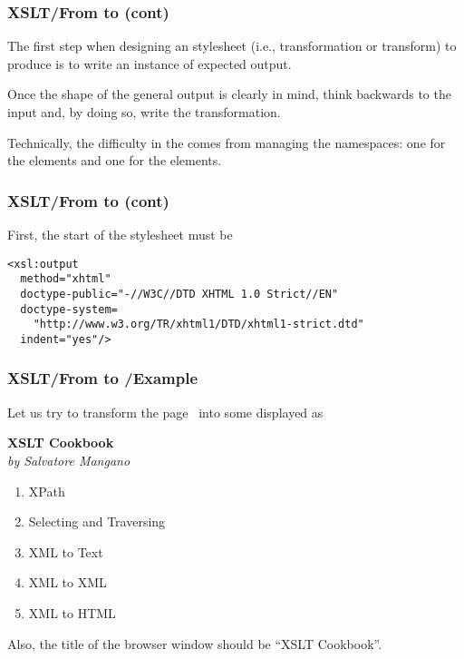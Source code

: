 %
\begin{frame}
\frametitle{XSLT/From \XML to \XHTML (cont)}

The first step when designing an \XSLT stylesheet (i.e.,
transformation or transform) to produce \XHTML is to write an instance
of expected output. 

\bigskip

Once the shape of the general output is clearly in mind, think
backwards to the input and, by doing so, write the transformation.

\bigskip

Technically, the difficulty in the \XSLT comes from managing the
namespaces: one for the \XSLT elements and one for the \XHTML
elements.

\end{frame}

%
\begin{frame}[containsverbatim]
\frametitle{XSLT/From \XML to \XHTML (cont)}

First, the start of the \XSLT stylesheet must be
{\small
\begin{verbatim}
<xsl:output
  method="xhtml"
  doctype-public="-//W3C//DTD XHTML 1.0 Strict//EN"
  doctype-system=
    "http://www.w3.org/TR/xhtml1/DTD/xhtml1-strict.dtd"
  indent="yes"/>
\end{verbatim}
}

\end{frame}

%
\begin{frame}
\frametitle{XSLT/From \XML to \XHTML{}/Example}

Let us try to transform the \XML page~\pageref{cookbook.xml} into some
\XHTML displayed as

\bigskip

\textbf{XSLT Cookbook}\\
\emph{by Salvatore Mangano}
\begin{enumerate}

  \item XPath

  \item Selecting and Traversing

  \item XML to Text

  \item XML to XML

  \item XML to HTML

\end{enumerate}
Also, the title of the browser window should be ``XSLT Cookbook''.

\end{frame}

